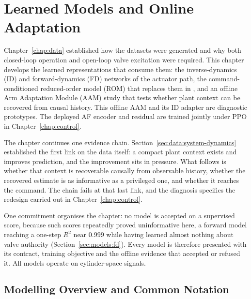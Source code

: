 \chapter{Learned Models and Online Adaptation}
\label{chap:models}

Chapter~\ref{chap:data} established how the datasets were generated and why
both closed-loop operation and open-loop valve excitation were required. This
chapter develops the learned representations that consume them: the
inverse-dynamics (ID) and forward-dynamics (FD) networks of the \ppoIDFD{}
actuator path, the command-conditioned reduced-order model (ROM) that replaces
them in \ppoROM, and an offline Arm Adaptation Module (AAM) study that tests
whether plant context can be recovered from causal history. This offline AAM
and its ID adapter are diagnostic prototypes. The deployed AF encoder and
residual are trained jointly under PPO in Chapter~\ref{chap:control}.

The chapter continues one evidence chain. Section~\ref{sec:data:system-dynamics}
established the first link on the data itself: a compact plant context exists
and improves prediction, and the improvement sits in pressure. What follows is
whether that context is recoverable causally from observable history, whether
the recovered estimate is as informative as a privileged one, and whether it
reaches the command. The chain fails at that last link, and the diagnosis
specifies the redesign carried out in Chapter~\ref{chap:control}.

One commitment organises the chapter: no model is accepted on a supervised
score, because such scores repeatedly proved uninformative here, a forward model
reaching a one-step $R^2$ near $0.999$ while having learned almost nothing about
valve authority (Section~\ref{sec:models:fd}). Every model is therefore
presented with its contract, training objective and the offline evidence that
accepted or refused it. All models operate on cylinder-space signals.

\section{Modelling Overview and Common Notation}
\label{sec:models:overview}

